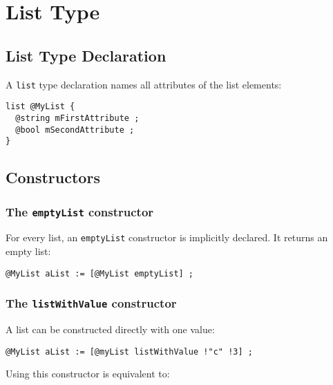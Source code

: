 
\chapter{List Type}

\section{List Type Declaration}

A \lstinline[language=galgas]!list! type declaration names all attributes of the list elements:

\begin{lstlisting}[language=galgas]
list @MyList {
  @string mFirstAttribute ;
  @bool mSecondAttribute ;
}
\end{lstlisting}

\section{Constructors}

\subsection{The \lstinline[language=galgas]!emptyList! constructor}

For every list, an \lstinline[language=galgas]!emptyList! constructor is implicitly declared. It returns an empty list:

\begin{lstlisting}[language=galgas]
@MyList aList := [@MyList emptyList] ;
\end{lstlisting}


\subsection{The \lstinline[language=galgas]!listWithValue! constructor}

A list can be constructed directly with one value:

\begin{lstlisting}[language=galgas]
@MyList aList := [@myList listWithValue !"c" !3] ;
\end{lstlisting}


Using this constructor is equivalent to:

